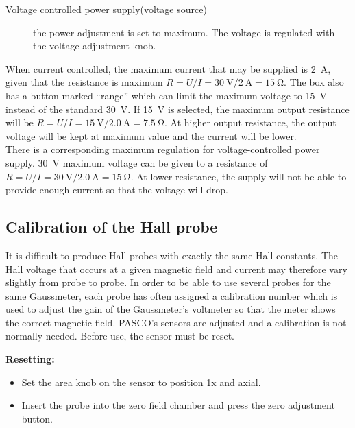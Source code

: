 \documentclass[../Elmag-labhefte-2020.tex]{subfiles}
\begin{document}
\begin{itemize}
\begin{description}
      \item[Voltage controlled power supply(voltage source)]  the power adjustment is set to maximum. The voltage is regulated with the voltage adjustment knob.
    \end{description}
    When current controlled, the maximum current that may be supplied is \SI{2}{\ampere}, given that the  resistance is maximum $R = U/I = \SI{30}{\volt} / \SI{2}{\ampere} = \SI{15}{\ohm}$.
    The box also has a button marked ``range'' which can limit the maximum voltage to \SI{15}{\volt} instead of the standard \SI{30}{\volt}. If \SI{15}{\volt} is selected, the maximum output resistance will be $R = U/I = \SI{15}{\volt} / \SI{2,0}{\ampere} = \SI{7,5}{\ohm}$. At higher output resistance, the output voltage will be kept at maximum value and the current will be lower.\\

    There is a corresponding maximum regulation for voltage-controlled power supply. \SI{30}{\volt} maximum voltage can be given to a resistance of $R = U/I = \SI{30}{\volt} / \SI{2,0}{\ampere} = \SI{15}{\ohm}$. At lower resistance, the supply will not be able to provide enough current so that the voltage will drop.
\end{itemize}

\subsection{Calibration of the Hall probe}

It is difficult to produce Hall probes with exactly the same Hall constants. The Hall voltage that occurs at a given magnetic field and current may therefore vary slightly from probe to probe. In order to be able to use several probes for the same Gaussmeter, each probe has often assigned a calibration number which is used to adjust the gain of the Gaussmeter's voltmeter so that the meter shows the correct magnetic field. PASCO's sensors are adjusted and a calibration is not normally needed. Before use, the sensor must be reset.

\textbf{Resetting:}
\vspace{-4mm}
\begin{itemize}
    \item Set the area knob on the sensor to position 1x and axial.
    \item Insert the probe into the zero field chamber and press the zero adjustment button.
\end{itemize}
\end{document}
